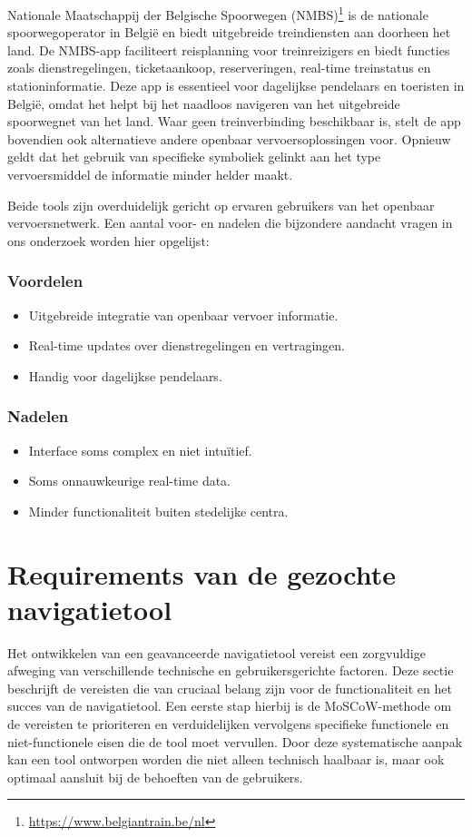 Nationale Maatschappij der Belgische Spoorwegen (NMBS)\footnote{\url{https://www.belgiantrain.be/nl}} is de nationale spoorwegoperator in België en biedt uitgebreide treindiensten aan doorheen het land. De NMBS-app faciliteert reisplanning voor treinreizigers en biedt functies zoals dienstregelingen, ticketaankoop, reserveringen, real-time treinstatus en stationinformatie. Deze app is essentieel voor dagelijkse pendelaars en toeristen in België, omdat het helpt bij het naadloos navigeren van het uitgebreide spoorwegnet van het land. Waar geen treinverbinding beschikbaar is, stelt de app bovendien ook alternatieve andere openbaar vervoersoplossingen voor. Opnieuw geldt dat het gebruik van specifieke symboliek gelinkt aan het type vervoersmiddel de informatie minder helder maakt.

Beide tools zijn overduidelijk gericht op ervaren gebruikers van het openbaar vervoersnetwerk. Een aantal voor- en nadelen die bijzondere aandacht vragen in ons onderzoek worden hier opgelijst:

\subsubsection*{Voordelen}
\begin{itemize}
    \item Uitgebreide integratie van openbaar vervoer informatie.
    \item Real-time updates over dienstregelingen en vertragingen.
    \item Handig voor dagelijkse pendelaars.
\end{itemize}
\subsubsection*{Nadelen}
\begin{itemize}
    \item Interface soms complex en niet intuïtief.
    \item Soms onnauwkeurige real-time data.
    \item Minder functionaliteit buiten stedelijke centra.
\end{itemize}

\section{Requirements van de gezochte navigatietool}
\label{sec:requirements-van-de-gezochte-navigatietool}

Het ontwikkelen van een geavanceerde navigatietool vereist een zorgvuldige afweging van verschillende technische en gebruikersgerichte factoren. Deze sectie beschrijft de vereisten die van cruciaal belang zijn voor de functionaliteit en het succes van de navigatietool. Een eerste stap hierbij is de MoSCoW-methode om de vereisten te prioriteren en verduidelijken vervolgens specifieke functionele en niet-functionele eisen die de tool moet vervullen. Door deze systematische aanpak kan een tool ontworpen worden die niet alleen technisch haalbaar is, maar ook optimaal aansluit bij de behoeften van de gebruikers.

